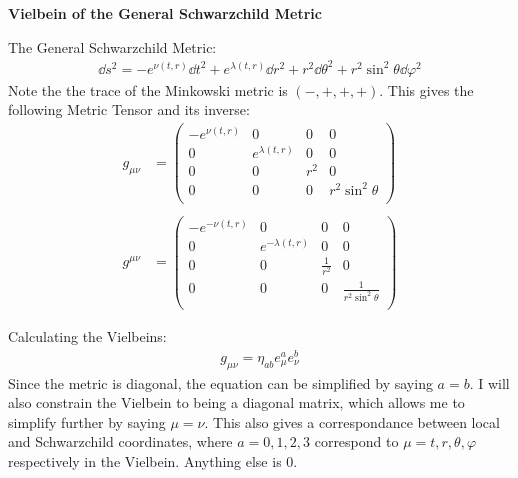\documentclass[12pt]{article}
\begin{document}
\begin{center}
  \Large\textbf{Vielbein of the General Schwarzchild Metric} \\
  \large{}
\end{center}

The General Schwarzchild Metric:
\begin{align}
  \dd{s^2} = -e^{\nu(t,r)}\dd{t^2} + e^{\lambda(t,r)}\dd{r^2} + r^2\dd{\theta^2} + r^2\sin^2{\theta}\dd{\varphi^2}
\end{align}
Note the the trace of the Minkowski metric is $(-,+,+,+)$. This gives the following Metric Tensor and its inverse:
\begin{align}
  g_{\mu\nu} &= 
  \begin{pmatrix}
    -e^{\nu(t,r)} & 0 & 0 & 0 \\
    0 & e^{\lambda(t,r)} & 0 & 0 \\
    0 & 0 & r^2 & 0 \\
    0 & 0 & 0 & r^2\sin^2{\theta} \\
  \end{pmatrix} \\ \nonumber \\
  g^{\mu\nu} &= 
  \begin{pmatrix}
    -e^{-\nu(t,r)} & 0 & 0 & 0 \\
    0 & e^{-\lambda(t,r)} & 0 & 0 \\
    0 & 0 & \frac{1}{r^2} & 0 \\
    0 & 0 & 0 & \frac{1}{r^2\sin^2{\theta}} \\
  \end{pmatrix}
\end{align}

Calculating the Vielbeins:
\begin{align}
  g_{\mu\nu} = \eta_{ab}e^a_\mu e^b_\nu
\end{align}
Since the metric is diagonal, the equation can be simplified by saying $a=b$. I will also constrain the Vielbein to being a diagonal matrix, which allows me to simplify further by saying $\mu = \nu$. This also gives a correspondance between local and Schwarzchild coordinates, where $a = 0,1,2,3$ correspond to $\mu = t,r,\theta,\varphi$ respectively in the Vielbein. Anything else is $0$.
\end{document}
